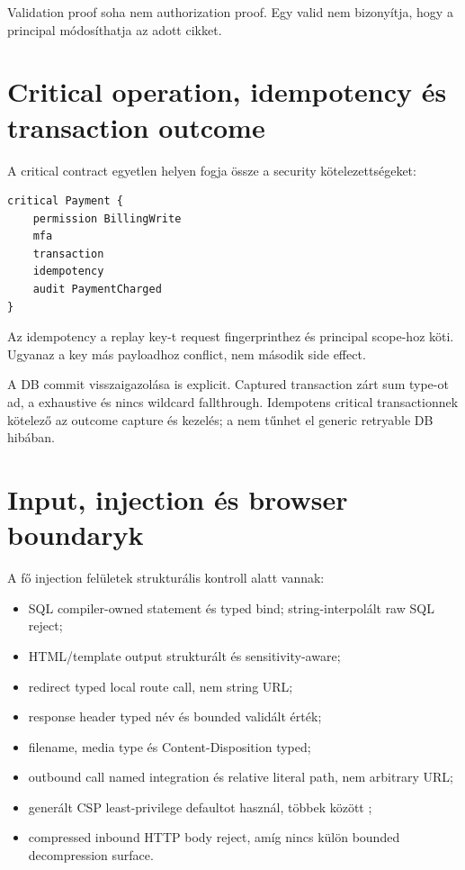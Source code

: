Validation proof soha nem authorization proof. Egy valid  nem bizonyítja, hogy a principal módosíthatja az adott cikket.

\section{Critical operation, idempotency és transaction outcome}

A critical contract egyetlen helyen fogja össze a security kötelezettségeket:

\begin{lstlisting}[language=Velran]
critical Payment {
    permission BillingWrite
    mfa
    transaction
    idempotency
    audit PaymentCharged
}
\end{lstlisting}

Az idempotency a replay key-t request fingerprinthez és principal scope-hoz köti. Ugyanaz a key más payloadhoz conflict, nem második side effect.

A DB commit visszaigazolása is explicit. Captured transaction zárt  sum type-ot ad, a  exhaustive és nincs wildcard fallthrough. Idempotens critical transactionnek kötelező az outcome capture és kezelés; a  nem tűnhet el generic retryable DB hibában.

\section{Input, injection és browser boundaryk}

A fő injection felületek strukturális kontroll alatt vannak:

\begin{itemize}
  \item SQL compiler-owned statement és typed bind; string-interpolált raw SQL reject;
  \item HTML/template output strukturált és sensitivity-aware;
  \item redirect typed local route call, nem string URL;
  \item response header typed név és bounded validált érték;
  \item filename, media type és Content-Disposition typed;
  \item outbound call named integration és relative literal path, nem arbitrary URL;
  \item generált CSP least-privilege defaultot használ, többek között ;
  \item compressed inbound HTTP body reject, amíg nincs külön bounded decompression surface.
\end{itemize}

